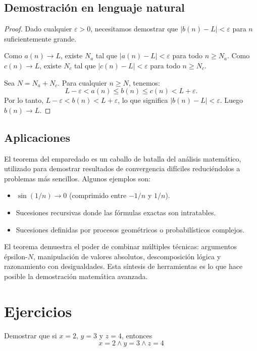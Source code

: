 \subsection{Demostración en lenguaje natural}

\begin{proof}
Dado cualquier $\varepsilon > 0$, necesitamos demostrar que
$|b(n)-L| < \varepsilon$ para $n$ suficientemente grande.

Como $a(n) \to L$, existe $N_a$ tal que $|a(n)-L| < \varepsilon$ para todo
$n \geq N_a$. Como $c(n) \to L$, existe $N_c$ tal que $|c(n)-L| < \varepsilon$
para todo $n \geq N_c$.

Sea $N = N_a + N_c$. Para cualquier $n \geq N$, tenemos:
\begin{equation}
  L - \varepsilon < a(n) \leq b(n) \leq c(n) < L + \varepsilon.
\end{equation}
Por lo tanto, $L - \varepsilon < b(n) < L + \varepsilon$, lo que significa
$|b(n)-L| < \varepsilon$. Luego $b(n) \to L$.
\end{proof}

\subsection{Aplicaciones}

El teorema del emparedado es un caballo de batalla del análisis matemático,
utilizado para demostrar resultados de convergencia difíciles reduciéndolos
a problemas más sencillos. Algunos ejemplos son:
\begin{itemize}
  \item $\sin(1/n) \to 0$ (comprimido entre $-1/n$ y $1/n$).
  \item Sucesiones recursivas donde las fórmulas exactas son intratables.
  \item Sucesiones definidas por procesos geométricos o probabilísticos
        complejos.
\end{itemize}

El teorema demuestra el poder de combinar múltiples técnicas: argumentos
épsilon-$N$, manipulación de valores absolutos, descomposición lógica y
razonamiento con desigualdades. Esta síntesis de herramientas es lo que
hace posible la demostración matemática avanzada.

\section{Ejercicios}

\begin{ejercicio}
  Demostrar que si $x=2$, $y=3$ y $z=4$, entonces
  $$x = 2 ∧ y = 3 ∧ z = 4$$
\end{ejercicio}

